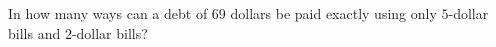 In how many ways can a debt of $69$ dollars be paid exactly using only $5$-dollar bills and $2$-dollar bills?

